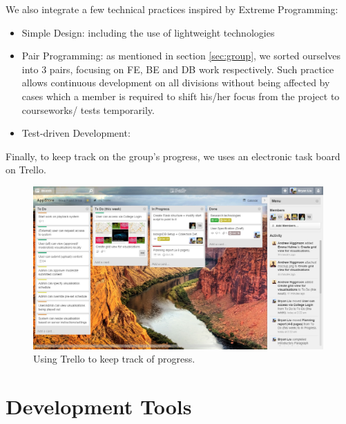 \documentclass[a4paper]{article}
\begin{document}
We also integrate a few technical practices inspired by Extreme Programming:
\begin{itemize}
  \item Simple Design: including the use of lightweight technologies
  \item Pair Programming: as mentioned in section \ref{sec:group}, we sorted
        ourselves into 3 pairs, focusing on FE, BE and DB work respectively.
        Such practice allows continuous development on all divisions without
        being affected by cases which a member is required to shift his/her
        focus from the project to courseworks/ tests temporarily.
  \item Test-driven Development: %

\end{itemize} 


Finally, to keep track on the group's progress, we uses an electronic task
board on Trello. %



\begin{figure}
  \centering
    \includegraphics[width = 0.99\textwidth]{./planning/trello.jpg}
   
  \caption{Using Trello to keep track of progress.}
  \label{fig:trello}
\end{figure}

\section{Development Tools}
\end{document}

